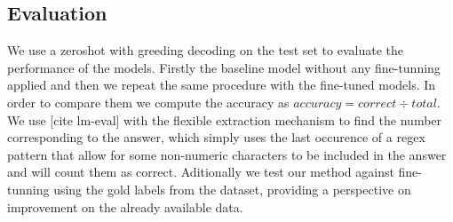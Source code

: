 \documentclass[a4paper,10pt]{article}
\begin{document}
\subsection{Evaluation}
We use a zeroshot with greeding decoding on the test set to evaluate the performance of the models. Firstly the baseline model without any fine-tunning applied and then we repeat the same procedure with the fine-tuned models. In order to compare them we compute the accuracy as  $accuracy = correct \div total$. We use [cite lm-eval] with the flexible extraction mechanism to find the number corresponding to the answer, which simply uses the last occurence of a regex pattern that allow for some non-numeric characters to be included in the answer and will count them as correct. Aditionally we test our method against fine-tunning using the gold labels from the dataset, providing a perspective on improvement on the already available data.
\end{document}
